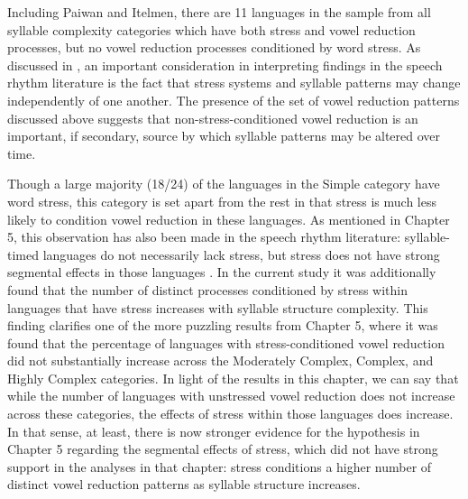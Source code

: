   Including Paiwan and Itelmen, there are 11 languages in the sample from all syllable complexity categories which have both stress and vowel reduction processes, but no vowel reduction processes conditioned by word stress. As discussed in , an important consideration in interpreting findings in the speech rhythm literature is the fact that stress systems and syllable patterns may change independently of one another. The presence of the set of vowel reduction patterns discussed above suggests that non-stress-conditioned vowel reduction is an important, if secondary, source by which syllable patterns may be altered over time.

  Though a large majority (18/24) of the languages in the Simple category have word stress, this category is set apart from the rest in that stress is much less likely to condition vowel reduction in these languages. As mentioned in Chapter 5, this observation has also been made in the speech rhythm literature: syllable-timed languages do not necessarily lack stress, but stress does not have strong segmental effects in those languages \citep{Auer1993}. In the current study it was additionally found that the number of distinct processes conditioned by stress within languages that have stress increases with syllable structure complexity. This finding clarifies one of the more puzzling results from Chapter 5, where it was found that the percentage of languages with stress-conditioned vowel reduction did not substantially increase across the Moderately Complex, Complex, and Highly Complex categories. In light of the results in this chapter, we can say that while the number of languages with unstressed vowel reduction does not increase across these categories, the effects of stress within those languages does increase. In that sense, at least, there is now stronger evidence for the hypothesis in Chapter 5 regarding the segmental effects of stress, which did not have strong support in the analyses in that chapter: stress conditions a higher number of distinct vowel reduction patterns as syllable structure increases.

